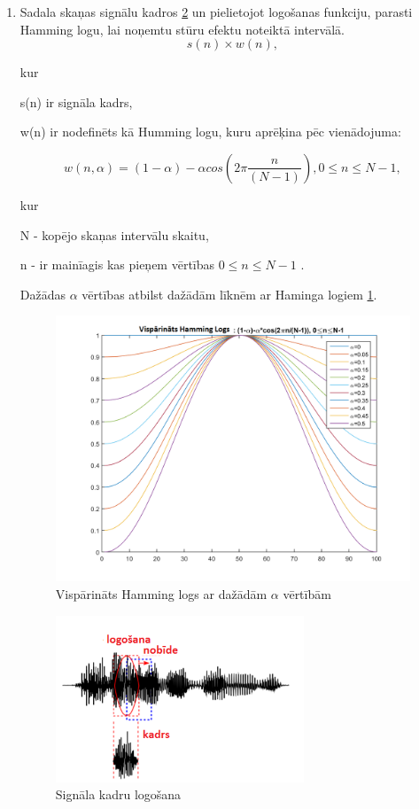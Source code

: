 \documentclass[12pt,paper=A4]{report}
\begin{document}
\begin{enumerate}
\item Sadala skaņas signālu kadros \ref{cadrs} un pielietojot logošanas funkciju, parasti Hamming logu, lai noņemtu stūru efektu noteiktā intervālā. \begin{equation}
s(n)\times w(n),
\end{equation}

kur 

s(n) ir signāla kadrs,

w(n) ir nodefinēts kā Humming logu, kuru aprēķina pēc vienādojuma:

\begin{equation}
w(n, \alpha) = (1 - \alpha) - \alpha cos(2\pi \frac{n}{(N-1)}) ,0\leq n \leq N-1,
\end{equation}

kur 

N - kopējo skaņas intervālu skaitu,

n - ir mainīagis kas pieņem vērtības $0\leq n \leq N-1$ \cite{dtw48}. 

Dažādas $\alpha$ vērtības atbilst dažādām līknēm ar Haminga logiem \ref{humlin}.
 \begin{figure}[h] \centering
\includegraphics[width=1.00\textwidth]{hamming} 
\caption{Vispārināts Hamming logs ar dažādām $\alpha$ vērtībām \cite{MFCC}}  \label{humlin} 
\end{figure}

 \begin{figure}[H] \centering
\includegraphics[width=0.70\textwidth]{framing0} 
\caption{Signāla kadru logošana \cite{dtw9}}  \label{cadrs} 
\end{figure}



\end{enumerate}
\end{document}
